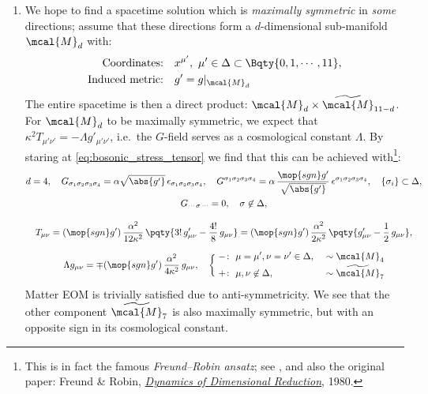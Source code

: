\documentclass[a4paper,10pt]{article}
\begin{document}
\begin{enumerate}
	\begin{enumerate}
	\item We hope to find a spacetime solution which is \textit{maximally symmetric} in \textit{some} directions; assume that these directions form a $d$-dimensional sub-manifold $\mcal{M}_d$ with:
	\begin{equation}
	\begin{aligned}
		\text{Coordinates:} &&&
			x^{\mu'},\ %
			\mu' \in \Delta \subset \Bqty{
				0,1,\cdots, 11
			},\\
		\text{Induced metric:} &&&
			g' = g|_{\mcal{M}_d}
	\end{aligned}
	\end{equation}
	The entire spacetime is then a direct product: $
		\mcal{M}_d
		\times \widetilde{\mcal{M}}_{11-d}
	$. 
	For $\mcal{M}_d$ to be maximally symmetric, we expect that $
		\kappa^2 T_{\mu'\nu'}
		= -\Lambda g'_{\mu'\nu'}
	$, i.e.\ the $G$-field serves as a cosmological constant $\Lambda$. By staring at \eqref{eq:bosonic_stress_tensor} we find that this can be achieved with\footnote{
		This is in fact the famous \textit{Freund--Robin ansatz}; see , and also the original paper: Freund \& Robin, \href{https://inspirehep.net/literature/154579}{\textit{Dynamics of Dimensional Reduction}}, 1980. 
	}:
	\begin{gather}
		d = 4,\quad
		G_{\sigma_1\sigma_2\sigma_3\sigma_4}
		= \alpha \sqrt{\abs{g'}}\,
			\epsilon_{
				\sigma_1\sigma_2\sigma_3\sigma_4
			},\quad
		G^{\sigma_1\sigma_2\sigma_3\sigma_4}
		= \alpha\,
			\frac{\mop{sgn} g'}{\sqrt{\abs{g'}}}\,
			\epsilon^{
				\sigma_1\sigma_2\sigma_3\sigma_4
			},\quad
		\{\sigma_i\}\subset \Delta,
		\\
		G_{\cdots\,\sigma\,\cdots}
		= 0,\quad
		\sigma \not\in\Delta,
	\\[2ex]
		T_{\mu\nu}
		= (\mop{sgn} g')\,
		\frac{\alpha^2}{12\kappa^2}\,\pqty{
			3!\,g'_{\mu\nu}
			- \frac{4!}{8}\,g_{\mu\nu}
		}
		= (\mop{sgn} g')\,
		\frac{\alpha^2}{2\kappa^2}\,
			\pqty{
				g'_{\mu\nu}
				- \frac{1}{2}\,g_{\mu\nu}
			},
	\\[1.5ex]
		\Lambda g_{\mu\nu}
		= \mp(\mop{sgn} g')\,
			\frac{\alpha^2}{4\kappa^2}\,
			g_{\mu\nu},\quad
	\left\lbrace\vbox to 12.5pt {}
	\right.
	\begin{aligned}
		- &\colon\ %
			\mu=\mu',\nu=\nu' \in \Delta,
			\hspace{-1.5ex}
			&&&\sim \mcal{M}_4\\[-.35ex]
		+ &\colon\ %
			\mu,\nu \not\in \Delta,
			&&&\sim \widetilde{\mcal{M}}_7
	\end{aligned}
	\end{gather}
	Matter EOM is trivially satisfied due to anti-symmetricity. We see that the other component $\widetilde{\mcal{M}}_7$ is also maximally symmetric, but with an opposite sign in its cosmological constant. 
	

\end{enumerate}
\end{enumerate}
\end{document}
